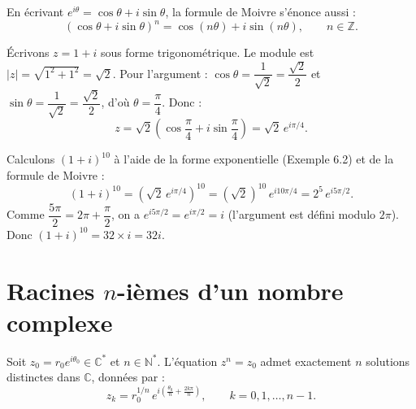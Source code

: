 \documentclass[a4paper,12pt,openany]{book}
\begin{document}
\begin{remarque}
En écrivant $e^{i\theta}=\cos\theta+i\sin\theta$, la formule de Moivre
s'énonce aussi :
\[
(\cos\theta+i\sin\theta)^n = \cos(n\theta)+i\sin(n\theta), \qquad
n\in\mathbb{Z}.
\]
\end{remarque}

\begin{exemple}[6.2]
Écrivons $z=1+i$ sous forme trigonométrique. Le module est $|z| =
\sqrt{1^2+1^2}=\sqrt2$. Pour l'argument : $\cos\theta =
\dfrac{1}{\sqrt2} = \dfrac{\sqrt2}{2}$ et $\sin\theta=\dfrac{1}{\sqrt2}=
\dfrac{\sqrt2}{2}$, d'où $\theta=\dfrac{\pi}{4}$. Donc :
\[
z = \sqrt2\left(\cos\frac{\pi}{4}+i\sin\frac{\pi}{4}\right) = \sqrt2\,
e^{i\pi/4}.
\]
\end{exemple}

\begin{exemple}[6.3]
Calculons $(1+i)^{10}$ à l'aide de la forme exponentielle (Exemple 6.2) et
de la formule de Moivre :
\[
(1+i)^{10} = \left(\sqrt2\,e^{i\pi/4}\right)^{10} = (\sqrt2)^{10}\,
e^{i10\pi/4} = 2^5\, e^{i5\pi/2}.
\]
Comme $\dfrac{5\pi}{2} = 2\pi+\dfrac{\pi}{2}$, on a $e^{i5\pi/2} =
e^{i\pi/2} = i$ (l'argument est défini modulo $2\pi$). Donc
$(1+i)^{10} = 32\times i = 32i$.
\end{exemple}

\section{Racines \texorpdfstring{$n$}{n}-ièmes d'un nombre complexe}


\begin{theoreme}
Soit $z_0 = r_0 e^{i\theta_0} \in \mathbb{C}^*$ et $n\in\mathbb{N}^*$.
L'équation $z^n=z_0$ admet exactement $n$ solutions distinctes dans
$\mathbb{C}$, données par :
\[
z_k = r_0^{1/n}\, e^{i\left(\frac{\theta_0}{n}+\frac{2k\pi}{n}\right)},
\qquad k=0,1,\dots,n-1.
\]
\end{theoreme}
\end{document}
